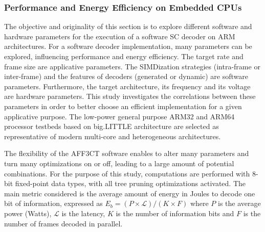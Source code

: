 \subsubsection{Performance and Energy Efficiency on Embedded CPUs}

The objective and originality of this section is to explore different software
and hardware parameters for the execution of a software SC decoder on ARM\R
architectures. For a software decoder implementation, many parameters can
be explored, influencing performance and energy efficiency. The target rate and
frame size are applicative parameters. The SIMDization strategies (intra-frame
or inter-frame) and the features of decoders (generated or dynamic) are software
parameters. Furthermore, the target architecture, its frequency and its voltage
are hardware parameters. This study investigates the correlations between these
parameters in order to better choose an efficient implementation for a given
applicative purpose. The low-power general purpose ARM32 and ARM64 processor
testbeds based on big.LITTLE architecture are selected as representative of
modern multi-core and heterogeneous architectures.

The flexibility of the AFF3CT software enables to alter many parameters and turn
many optimizations on or off, leading to a large amount of potential
combinations. For the purpose of this study, computations are performed with
8-bit fixed-point data types, with all tree pruning optimizations activated. The
main metric considered is the average amount of energy in Joules to decode one
bit of information, expressed  as  $E_b = (P \times \mathcal{L}) / (K \times F)$
where $P$ is the average power (Watts), $\mathcal{L}$ is the latency, $K$ is the
number of information bits and $F$ is the number of frames decoded in parallel.

